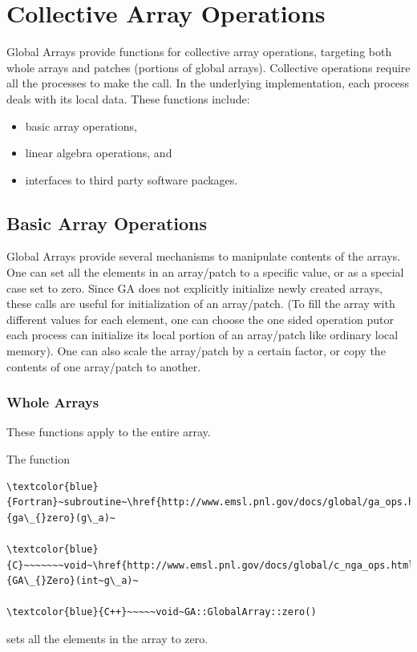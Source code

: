 \chapter{Collective Array Operations}

Global Arrays provide functions for collective array operations, targeting
both whole arrays and patches (portions of global arrays). Collective
operations require all the processes to make the call. In the underlying
implementation, each process deals with its local data. These functions
include:
\begin{itemize}
\item basic array operations, 
\item linear algebra operations, and 
\item interfaces to third party software packages.
\end{itemize}

\section{Basic Array Operations }

Global Arrays provide several mechanisms to manipulate contents of
the arrays. One can set all the elements in an array/patch to a specific
value, or as a special case set to zero. Since GA does not explicitly
initialize newly created arrays, these calls are useful for initialization
of an array/patch. (To fill the array with different values for each
element, one can choose the one sided operation putor each process
can initialize its local portion of an array/patch like ordinary local
memory). One can also scale the array/patch by a certain factor, or
copy the contents of one array/patch to another. 


\subsection{Whole Arrays }

These functions apply to the entire array.

The function
\begin{verbatim}
\textcolor{blue}{Fortran}~subroutine~\href{http://www.emsl.pnl.gov/docs/global/ga_ops.html\#ga_zero}{ga\_{}zero}(g\_a)~

\textcolor{blue}{C}~~~~~~~void~\href{http://www.emsl.pnl.gov/docs/global/c_nga_ops.html\#ga_zero}{GA\_{}Zero}(int~g\_a)~

\textcolor{blue}{C++}~~~~~void~GA::GlobalArray::zero()
\end{verbatim}
sets all the elements in the array to zero.

